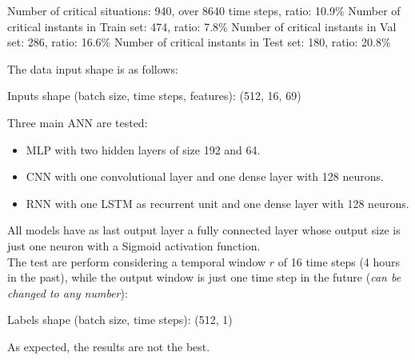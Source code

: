 \begin{algorithm}[H]
    \State Number of critical situations: 940, over 8640 time steps, ratio: 10.9\%
    \State
    \State Number of critical instants in Train set: 474, ratio: 7.8\%
    \State Number of critical instants in Val set: 286, ratio: 16.6\%
    \State Number of critical instants in Test set: 180, ratio: 20.8\%
\end{algorithm}

The data input shape is as follows:

\begin{algorithm}[H]
    \State Inputs shape (batch size, time steps, features): (512, 16, 69)
\end{algorithm}

Three main \gls{ANN} are tested:
\begin{itemize}
    \item \gls{MLP} with two hidden layers of size 192 and 64.
    \item \gls{CNN} with one convolutional layer and one dense layer with 128 neurons.
    \item \gls{RNN} with one \gls{LSTM} as recurrent unit and one dense layer with 128 neurons.
\end{itemize}
All models have as last output layer a fully connected layer whose output size is just one neuron with a Sigmoid activation function.\\

The test are perform considering a temporal window $r$ of 16 time steps (4 hours in the past), while the output window is just one time step in the future (\emph{can be changed to any number}):
\begin{algorithm}[H]
    \State Labels shape (batch size, time steps): (512, 1)
\end{algorithm}

\noindent As expected, the results are not the best. 

